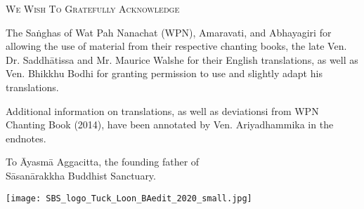 \cleartorecto
\thispagestyle{empty}

{\setlength{\parskip}{10pt}

{\centering\fontsize{20}{25}\selectfont
\textsc{We Wish To Gratefully Acknowledge}
\par}

The Saṅghas of Wat Pah Nanachat (WPN), Amaravati, and Abhayagiri for allowing the use of material from their respective chanting books, the late Ven. Dr. Saddhātissa and Mr. Maurice Walshe for their English translations, as well as Ven. Bhikkhu Bodhi for granting permission to use and slightly adapt his translations.

Additional information on translations, as well as deviationsi from WPN Chanting Book (2014), have been annotated by Ven. Ariyadhammika in the endnotes.

\bigskip

{\centering
To Āyasmā Aggacitta, the founding father of\\
Sāsanārakkha Buddhist Sanctuary.

\bigskip

\texttt{[image: SBS\_logo\_Tuck\_Loon\_BAedit\_2020\_small.jpg]}

}

}
